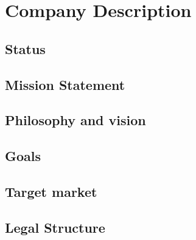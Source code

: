 \section{Company Description}
\subsection{Status}
\subsection{Mission Statement}
\subsection{Philosophy and vision}
\subsection{Goals}
\subsection{Target market}
\subsection{Legal Structure}